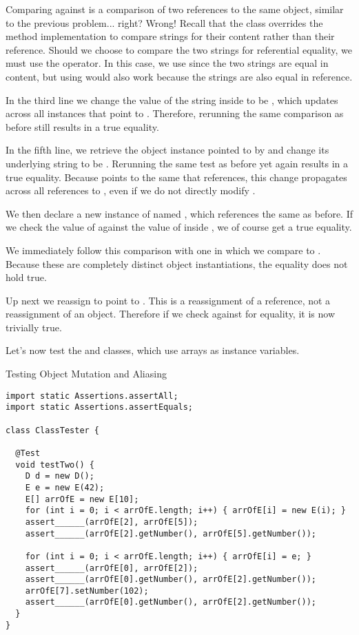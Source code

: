 Comparing  against  is a comparison of two references to the same object, similar to the previous problem... right? Wrong! Recall that the  class overrides the  method implementation to compare strings for their content rather than their reference. Should we choose to compare the two strings for referential equality, we must use the \ttt{==} operator. In this case, we use  since the two strings are equal in content, but using \ttt{==} would also work because the strings are also equal in reference.

In the third line we change the value of the string inside  to be , which updates across all instances that point to . Therefore, rerunning the same comparison as before still results in a true equality.

In the fifth line, we retrieve the  object instance pointed to by  and change its underlying string to be . Rerunning the same test as before yet again results in a true equality. Because  points to the same  that  references, this change propagates across all references to , even if we do not directly modify .

We then declare a new instance of  named , which references the same  as before. If we check the value of  against the value of  inside , we of course get a true equality.

We immediately follow this comparison with one in which we compare  to . Because these are completely distinct object instantiations, the equality does not hold true.

Up next we reassign  to point to . This is a reassignment of a reference, not a reassignment of an object. Therefore if we check  against  for equality, it is now trivially true.

Let's now test the  and  classes, which use arrays as instance variables.

\begin{cl}{Testing Object Mutation and Aliasing}
\begin{lstlisting}[language=MyJava]
import static Assertions.assertAll;
import static Assertions.assertEquals;

class ClassTester {

  @Test
  void testTwo() {
    D d = new D();
    E e = new E(42);
    E[] arrOfE = new E[10];
    for (int i = 0; i < arrOfE.length; i++) { arrOfE[i] = new E(i); }
    assert______(arrOfE[2], arrOfE[5]);
    assert______(arrOfE[2].getNumber(), arrOfE[5].getNumber());

    for (int i = 0; i < arrOfE.length; i++) { arrOfE[i] = e; }
    assert______(arrOfE[0], arrOfE[2]);
    assert______(arrOfE[0].getNumber(), arrOfE[2].getNumber());
    arrOfE[7].setNumber(102);
    assert______(arrOfE[0].getNumber(), arrOfE[2].getNumber());
  }
}
\end{lstlisting}
\end{cl}

